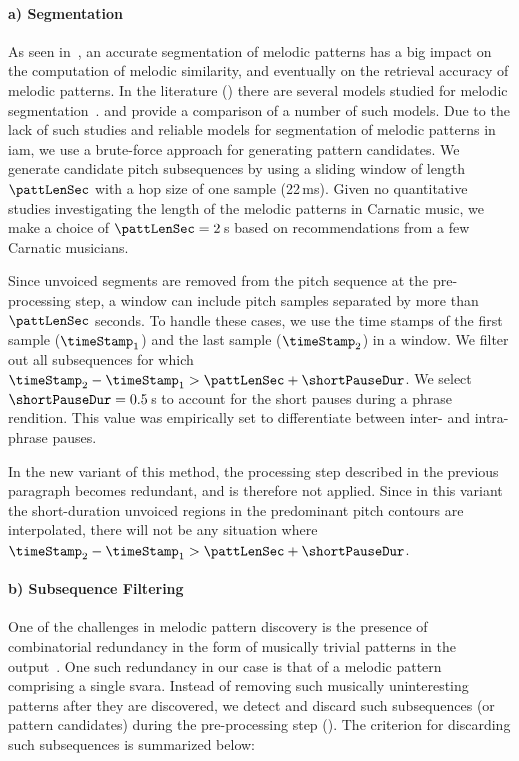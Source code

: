 \paragraph{a) Segmentation} 

As seen in~, an accurate segmentation of melodic patterns has a big impact on the computation of melodic similarity, and eventually on the retrieval accuracy of melodic patterns. In the literature () there are several models studied for melodic segmentation~\citep{Cambouropoulos2006,muller2009robust,cambouropoulos2001local}. \cite{pearce2008comparison} and \cite{rodriguez2014comparing} provide a comparison of a number of such models. Due to the lack of such studies and reliable models for segmentation of melodic patterns in \gls{iam}, we use a brute-force approach for generating pattern candidates. We generate candidate pitch subsequences by using a sliding window of length $\pattLenSec$ with a hop size of one sample (22\,ms). Given no quantitative studies investigating the length of the melodic patterns in Carnatic music, we make a choice of $\pattLenSec = 2$\,s based on recommendations from a few Carnatic musicians.

Since unvoiced segments are removed from the pitch sequence at the pre-processing step, a window can include pitch samples separated by more than $\pattLenSec$ seconds. To handle these cases, we use the time stamps of the first sample ($\timeStamp_1$) and the last sample ($\timeStamp_2$) in a window. We filter out all subsequences for which $\timeStamp_2-\timeStamp_1 > \pattLenSec + \shortPauseDur$. We select $\shortPauseDur =0.5$\,s to account for the short pauses during a phrase rendition. This value was empirically set to differentiate between inter- and intra-phrase pauses. 

In the new variant of this method, the processing step described in the previous paragraph becomes redundant, and is therefore not applied. Since in this variant the short-duration unvoiced regions in the predominant pitch contours are interpolated, there will not be any situation where $\timeStamp_2-\timeStamp_1 > \pattLenSec + \shortPauseDur$. 


\paragraph{b) Subsequence Filtering} 

One of the challenges in melodic pattern discovery is the presence of combinatorial redundancy in the form of musically trivial patterns in the output~\citep{Lartillot2005}. One such redundancy in our case is that of a melodic pattern comprising a single \gls{svara}. Instead of removing such musically uninteresting patterns after they are discovered, we detect and discard such subsequences (or pattern candidates) during the pre-processing step (). The criterion for discarding such subsequences is summarized below:

